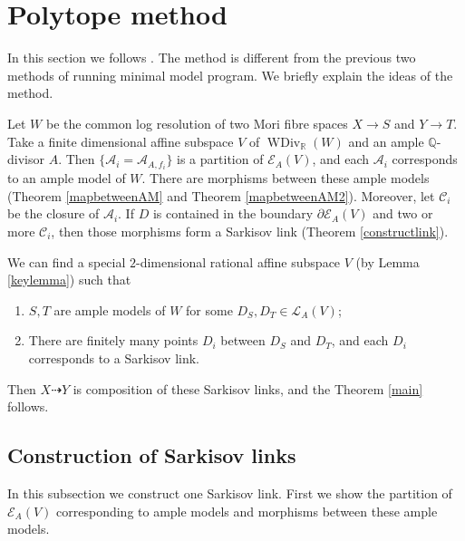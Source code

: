 \documentclass[11pt]{amsart}
\begin{document}
\section{Polytope method}\label{thirdmethod}
In this section we follows \cite{haconSarkisovProgram2012}.
The method is different from the previous two methods of running minimal model program. We briefly explain the ideas of the method.

Let $W$ be the common log resolution of two Mori fibre spaces $X\to S$ and $Y\to T$. Take a finite dimensional affine subspace $V$ of $\operatorname{WDiv}_{\mathbb{R}}(W)$ and an ample $\mathbb{Q}$-divisor $A$. Then $\{\mathcal{A}_{i} =\mathcal{A}_{A,f_{i}}\} $ is a partition of $\mathcal{E}_{A}(V)$, and each $\mathcal{A}_{i}$ corresponds to an ample model of $W$.    There are morphisms between these ample models (Theorem \ref{mapbetweenAM} and Theorem \ref{mapbetweenAM2}). Moreover, let $\mathcal{C}_{i}$ be the closure of $\mathcal{A}_{i}$. If $D$ is contained in the boundary  $\partial \mathcal{E}_{A}(V)$ and two or more $\mathcal{C}_{i}$, then those morphisms form a Sarkisov link (Theorem \ref{constructlink}).

We can find a special $2$-dimensional rational affine subspace  $V$ (by Lemma \ref{keylemma}) such that 
\begin{enumerate}
  \item $S,T$ are ample models of $W$ for some $D_{S},D_{T} \in \mathcal{L}_{A}(V)$;
  \item  There are finitely many points  $D_{i}$ between $D_{S}$ and $D_{T}$, and each $D_{i}$ corresponds to a Sarkisov link.
\end{enumerate}

Then  $X\dashrightarrow Y$ is composition of these Sarkisov links, and the Theorem \ref{main} follows.

\subsection{Construction of Sarkisov links}
In this subsection we construct one Sarkisov link. First we show the partition of $\mathcal{E}_{A}(V)$  corresponding to ample models and morphisms between these ample models.
\end{document}
